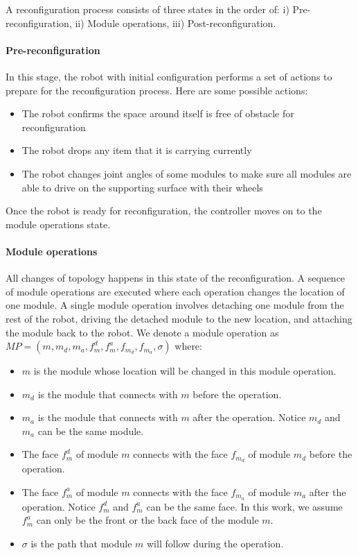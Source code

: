\documentclass[conference]{IEEEtran}
\begin{document}
A reconfiguration process consists of three states in the order of: i) Pre-reconfiguration, ii) Module operations, iii) Post-reconfiguration.

\paragraph{Pre-reconfiguration} In this stage, the robot with initial configuration performs a set of actions to prepare for the reconfiguration process. Here are some possible actions:
\begin{itemize}
\item The robot confirms the space around itself is free of obstacle for reconfiguration
\item The robot drops any item that it is carrying currently
\item The robot changes joint angles of some modules to make sure all modules are able to drive on the supporting surface with their wheels
\end{itemize}
Once the robot is ready for reconfiguration, the controller moves on to the module operations state.

\paragraph{Module operations} All changes of topology happens in this state of the reconfiguration.
A sequence of module operations are executed where each operation changes the location of one module.
A single module operation involves detaching one module from the rest of the robot, driving the detached module to the new location, and attaching the module back to the robot.
We denote a module operation as $MP=\left(m, m_d, m_a, f_m^d, f_m^a, f_{m_d}, f_{m_a}, \sigma \right)$ where:
\begin{itemize}
\item $m$ is the module whose location will be changed in this module operation.
\item $m_d$ is the module that connects with $m$ before the operation.
\item $m_a$ is the module that connects with $m$ after the operation. Notice $m_d$ and $m_a$ can be the same module. 
\item The face $f_m^d$ of module $m$ connects with the face $f_{m_d}$ of module $m_d$ before the operation.
\item The face $f_m^a$ of module $m$ connects with the face $f_{m_a}$ of module $m_a$ after the operation. Notice $f_m^d$ and $f_m^a$ can be the same face. In this work, we assume $f_m^a$ can only be the front or the back face of the module $m$.
\item $\sigma$ is the path that module $m$ will follow during the operation.
\end{itemize}
\end{document}
